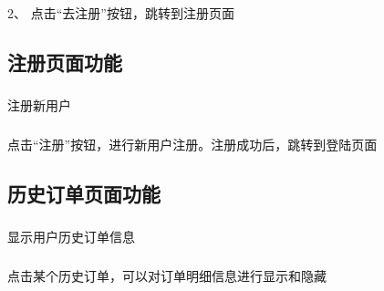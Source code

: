2、 点击“去注册”按钮，跳转到注册页面~\\

\subsection{注册页面功能}
\subsubsection*{}
注册新用户
\subsubsection*{}
点击“注册”按钮，进行新用户注册。注册成功后，跳转到登陆页面~\\

\subsection{历史订单页面功能}
\subsubsection*{}
显示用户历史订单信息
\subsubsection*{}
点击某个历史订单，可以对订单明细信息进行显示和隐藏

